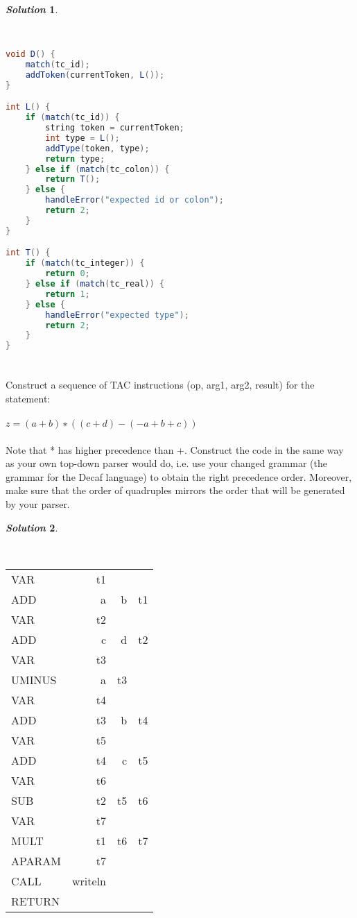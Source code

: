 \documentclass[11pt, a4paper]{article}
\newtheorem*{solution}{\emph{Solution}}
\begin{document}
\begin{solution}\end{solution}~\\
\begin{lstlisting}[language=Java]
void D() {
	match(tc_id);
	addToken(currentToken, L());
}

int L() {
	if (match(tc_id)) {
		string token = currentToken;
		int type = L();
		addType(token, type);
		return type;
	} else if (match(tc_colon)) {
		return T();
	} else {
		handleError("expected id or colon");
		return 2;
	}
}

int T() {
	if (match(tc_integer)) {
		return 0;
	} else if (match(tc_real)) {
		return 1;
	} else {
		handleError("expected type");
		return 2;
	}
}
\end{lstlisting}

\section{}
	Construct a sequence of TAC instructions (op, arg1, arg2, result) for the statement:\\~\\
	$z = (a+b)∗((c+d)−(−a+b+c))$\\~\\
	Note that * has higher precedence than +. Construct the code in the same way as your own top-down parser would do, i.e. use your changed grammar (the grammar for the Decaf language) to obtain the right precedence order. Moreover, make sure that the order of quadruples mirrors the order that will be generated by your parser.

\begin{solution}\end{solution}~\\
\begin{tabular}{lrrr}
VAR & t1 &&\\
ADD & a & b & t1\\
VAR  & t2 &&\\
ADD   &  c  & d  & t2\\
VAR  &   t3&&\\
UMINUS & a &  t3&\\
VAR  &   t4&&\\
ADD  &   t3 & b &  t4\\
VAR  &   t5&&\\
ADD &    t4 & c  & t5\\
VAR   &  t6&&\\
SUB   &  t2 & t5 & t6\\
VAR  &   t7\\
MULT   & t1&  t6 & t7\\
APARAM & t7&&\\
CALL  &  writeln&&\\
RETURN&&&\\
\end{tabular}
\end{document}
